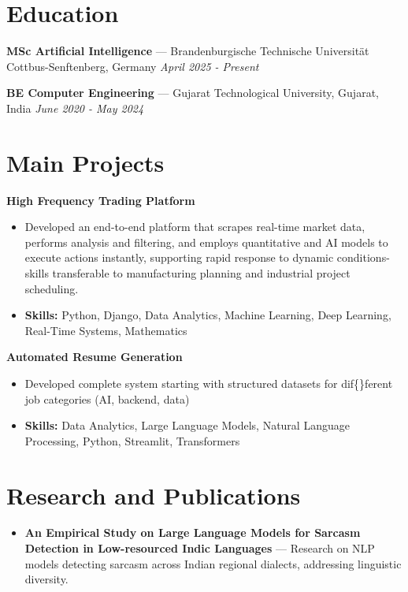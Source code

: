 \documentclass[a4paper,10pt]{article}
\begin{document}
\section*{Education}
\textbf{MSc Artificial Intelligence} — Brandenburgische Technische Universität Cottbus-Senftenberg, Germany \hfill \textit{April 2025 - Present}\par
\vspace{1.5pt}
\textbf{BE Computer Engineering} — Gujarat Technological University, Gujarat, India \hfill \textit{June 2020 - May 2024}\par

\section*{Main Projects}
\textbf{High Frequency Trading Platform}\par
\vspace{1pt}
\begin{itemize}
  \item Developed an end-to-end platform that scrapes real-time market data, performs analysis and filtering, and employs quantitative and AI models to execute actions instantly, supporting rapid response to dynamic conditions-skills transferable to manufacturing planning and industrial project scheduling.
  \item \textbf{Skills:} Python, Django, Data Analytics, Machine Learning, Deep Learning, Real-Time Systems, Mathematics
\end{itemize}
\vspace{3pt}
\textbf{Automated Resume Generation}\par
\vspace{1pt}
\begin{itemize}
  \item Developed complete system starting with structured datasets for dif\{\}ferent job categories (AI, backend, data)
  \item \textbf{Skills:} Data Analytics, Large Language Models, Natural Language Processing, Python, Streamlit, Transformers
\end{itemize}

\section*{Research and Publications}
\begin{itemize}
\item \textbf{An Empirical Study on Large Language Models for Sarcasm Detection in Low-resourced Indic Languages} — Research on NLP models detecting sarcasm across Indian regional dialects, addressing linguistic diversity.
\end{itemize}
\end{document}
